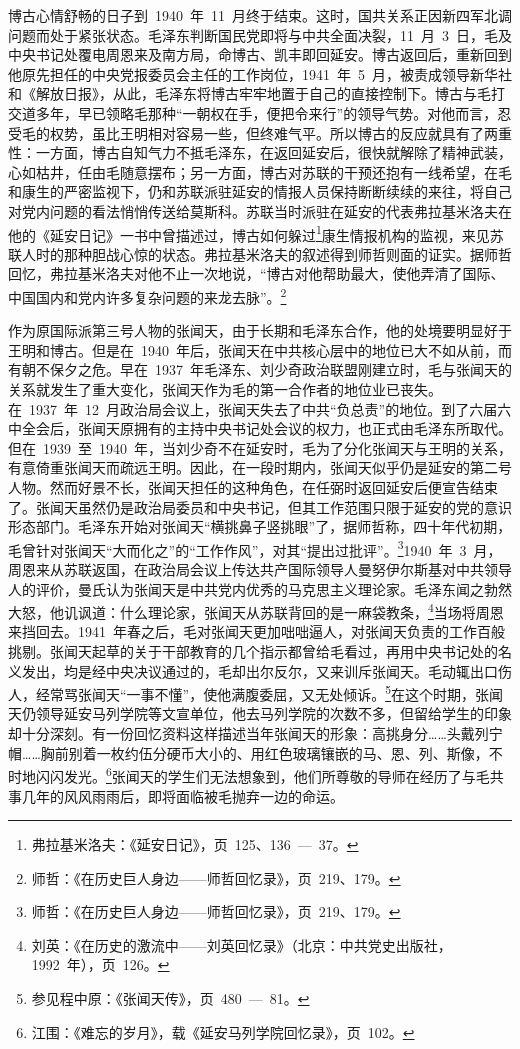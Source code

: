 博古心情舒畅的日子到~1940~年~11~月终于结束。这时，国共关系正因新四军北调问题而处于紧张状态。毛泽东判断国民党即将与中共全面决裂，11~月~3~日，毛及中央书记处覆电周恩来及南方局，命博古、凯丰即回延安。博古返回后，重新回到他原先担任的中央党报委员会主任的工作岗位，1941~年~5~月，被责成领导新华社和《解放日报》，从此，毛泽东将博古牢牢地置于自己的直接控制下。博古与毛打交道多年，早已领略毛那种“一朝权在手，便把令来行”的领导气势。对他而言，忍受毛的权势，虽比王明相对容易一些，但终难气平。所以博古的反应就具有了两重性：一方面，博古自知气力不抵毛泽东，在返回延安后，很快就解除了精神武装，心如枯井，任由毛随意摆布；另一方面，博古对苏联的干预还抱有一线希望，在毛和康生的严密监视下，仍和苏联派驻延安的情报人员保持断断续续的来往，将自己对党内问题的看法悄悄传送给莫斯科。苏联当时派驻在延安的代表弗拉基米洛夫在他的《延安日记》一书中曾描述过，博古如何躲过\footnote{弗拉基米洛夫：《延安日记》，页~125、136~—~37。}康生情报机构的监视，来见苏联人时的那种胆战心惊的状态。弗拉基米洛夫的叙述得到师哲则面的证实。据师哲回忆，弗拉基米洛夫对他不止一次地说，“博古对他帮助最大，使他弄清了国际、中国国内和党内许多复杂问题的来龙去脉”。\footnote{师哲：《在历史巨人身边——师哲回忆录》，页~219、179。}

作为原国际派第三号人物的张闻天，由于长期和毛泽东合作，他的处境要明显好于王明和博古。但是在~1940~年后，张闻天在中共核心层中的地位已大不如从前，而有朝不保夕之危。早在~1937~年毛泽东、刘少奇政治联盟刚建立时，毛与张闻天的关系就发生了重大变化，张闻天作为毛的第一合作者的地位业已丧失。在~1937~年~12~月政治局会议上，张闻天失去了中共“负总责”的地位。到了六届六中全会后，张闻天原拥有的主持中央书记处会议的权力，也正式由毛泽东所取代。但在~1939~至~1940~年，当刘少奇不在延安时，毛为了分化张闻天与王明的关系，有意倚重张闻天而疏远王明。因此，在一段时期内，张闻天似乎仍是延安的第二号人物。然而好景不长，张闻天担任的这种角色，在任弼时返回延安后便宣告结束了。张闻天虽然仍是政治局委员和中央书记，但其工作范围只限于延安的党的意识形态部门。毛泽东开始对张闻天“横挑鼻子竖挑眼”了，据师哲称，四十年代初期，毛曾针对张闻天“大而化之”的“工作作风”，对其“提出过批评”。\footnote{师哲：《在历史巨人身边——师哲回忆录》，页~219、179。}1940~年~3~月，周恩来从苏联返国，在政治局会议上传达共产国际领导人曼努伊尔斯基对中共领导人的评价，曼氏认为张闻天是中共党内优秀的马克思主义理论家。毛泽东闻之勃然大怒，他讥讽道：什么理论家，张闻天从苏联背回的是一麻袋教条，\footnote{刘英：《在历史的激流中——刘英回忆录》（北京：中共党史出版社，1992~年），页~126。}当场将周恩来挡回去。1941~年春之后，毛对张闻天更加咄咄逼人，对张闻天负责的工作百般挑剔。张闻天起草的关于干部教育的几个指示都曾给毛看过，再用中央书记处的名义发出，均是经中央决议通过的，毛却出尔反尔，又来训斥张闻天。毛动辄出口伤人，经常骂张闻天“一事不懂”，使他满腹委屈，又无处倾诉。\footnote{参见程中原：《张闻天传》，页~480~—~81。}在这个时期，张闻天仍领导延安马列学院等文宣单位，他去马列学院的次数不多，但留给学生的印象却十分深刻。有一份回忆资料这样描述当年张闻天的形象：高挑身分……头戴列宁帽……胸前别着一枚约伍分硬币大小的、用红色玻璃镶嵌的马、恩、列、斯像，不时地闪闪发光。\footnote{江围：《难忘的岁月》，载《延安马列学院回忆录》，页~102。}张闻天的学生们无法想象到，他们所尊敬的导师在经历了与毛共事几年的风风雨雨后，即将面临被毛抛弃一边的命运。


